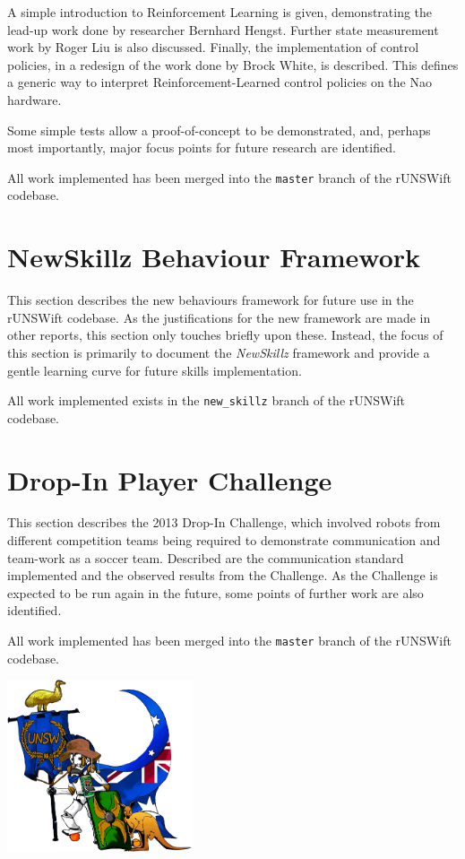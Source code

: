 \documentclass[pdftex,11pt,a4paper]{report}
\begin{document}
A simple introduction to Reinforcement Learning is given, demonstrating the lead-up work done by researcher Bernhard Hengst.\cite{bernhard_rl} Further state measurement work by Roger Liu is also discussed.\cite{liu} Finally, the implementation of control policies, in a redesign of the work done by Brock White, is described.\cite{white} This defines a generic way to interpret Reinforcement-Learned control policies on the Nao hardware. 

Some simple tests allow a proof-of-concept to be demonstrated, and, perhaps most importantly, major focus points for future research are identified.

All work implemented has been merged into the \texttt{master} branch of the rUNSWift codebase.

\section*{NewSkillz Behaviour Framework}

This section describes the new behaviours framework for future use in the rUNSWift codebase. As the justifications for the new framework are made in other reports\cite{simulator}, this section only touches briefly upon these. Instead, the focus of this section is primarily to document the \textit{NewSkillz} framework and provide a gentle learning curve for future skills implementation.

All work implemented exists in the \texttt{new\_skillz} branch of the rUNSWift codebase.

\section*{Drop-In Player Challenge}

This section describes the 2013 Drop-In Challenge, which involved robots from different competition teams being required to demonstrate communication and team-work as a soccer team. Described are the communication standard implemented and the observed results from the Challenge. As the Challenge is expected to be run again in the future, some points of further work are also identified.

All work implemented has been merged into the \texttt{master} branch of the rUNSWift codebase.





\newpage



\centering
\includegraphics[height=2in]{img/aus_stars.png}
\end{document}
